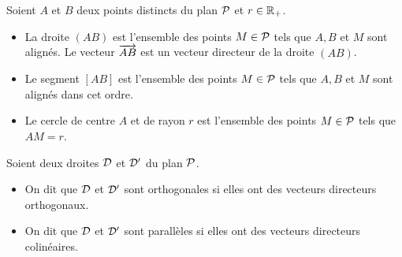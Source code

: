Soient $A$ et $B$ deux points distincts du plan $\P$ et $r \in \R_+$.
\begin{itemize}
  \item La droite $(AB)$ est l'ensemble des points $M \in \P$ tels que $A, B$ et 
    $M$ sont alignés. Le vecteur $\vect{AB}$ est un vecteur directeur de la 
    droite $(AB)$.
  \item Le segment $[AB]$ est l'ensemble des points $M \in \P$ tels que $A, B$ 
    et $M$ sont alignés dans cet ordre.
  \item Le cercle de centre $A$ et de rayon $r$ est l'ensemble des points $M \in 
    \P$ tels que $AM=r$.
\end{itemize}
Soient deux droites $\Dr$ et $\Dr'$ du plan $\P$.
\begin{itemize}
  \item On dit que $\Dr$ et $\Dr'$ sont orthogonales si elles ont des vecteurs 
    directeurs orthogonaux.
  \item On dit que $\Dr$ et $\Dr'$ sont parallèles si elles ont des vecteurs 
    directeurs colinéaires.
\end{itemize}
